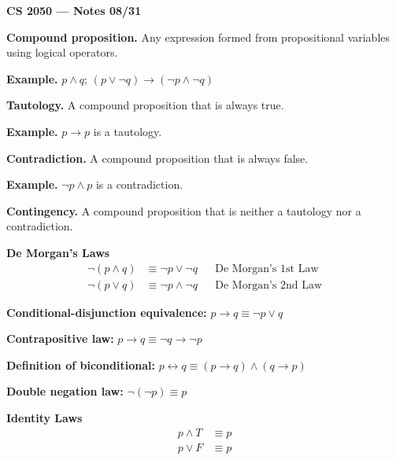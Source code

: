 \documentclass{article}
\begin{document}
\textbf{CS 2050 --- Notes 08/31}

\bigskip

\textbf{Compound proposition.} Any expression formed from propositional variables using logical operators.

\medskip

\textbf{Example.} $p \land q$; \quad $(p \lor \lnot q) \to (\lnot p \land \lnot q)$

\bigskip

\textbf{Tautology.} A compound proposition that is always true.

\medskip

\textbf{Example.} $p \to p$ is a tautology.

\bigskip

\textbf{Contradiction.} A compound proposition that is always false.

\medskip

\textbf{Example.} $\lnot p \land p$ is a contradiction.

\bigskip

\textbf{Contingency.} A compound proposition that is neither a tautology nor a contradiction.

\bigskip

\textbf{De Morgan's Laws}
\begin{align*}
\lnot (p \land q) &\equiv \lnot p \lor \lnot q & &\text{De Morgan's 1st Law} \\
\lnot (p \lor q) &\equiv \lnot p \land \lnot q & &\text{De Morgan's 2nd Law}
\end{align*}

\bigskip

\textbf{Conditional-disjunction equivalence:} $p \to q \equiv \lnot p \lor q$

\medskip

\textbf{Contrapositive law:} $p \to q \equiv \lnot q \to \lnot p$

\medskip

\textbf{Definition of biconditional:} $p \leftrightarrow q \equiv (p \to q) \land (q \to p)$

\bigskip

\textbf{Double negation law:} $\lnot (\lnot p) \equiv p$

\medskip

\textbf{Identity Laws}
\begin{align*}
p \land T &\equiv p \\
p \lor F &\equiv p
\end{align*}
\end{document}
